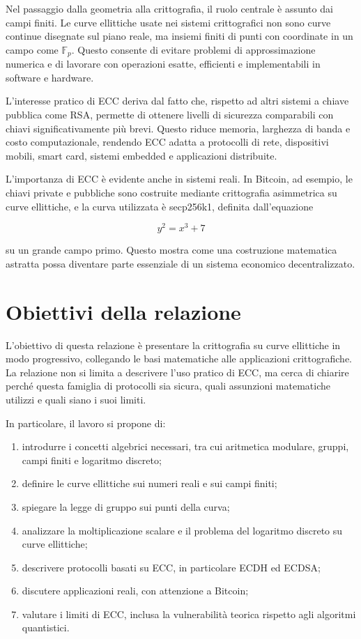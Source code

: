 \documentclass[12pt,a4paper,oneside]{report}
\begin{document}
Nel passaggio dalla geometria alla crittografia, il ruolo centrale è assunto dai campi finiti. Le curve ellittiche usate nei sistemi crittografici non sono curve continue disegnate sul piano reale, ma insiemi finiti di punti con coordinate in un campo come \(\mathbb{F}_p\). Questo consente di evitare problemi di approssimazione numerica e di lavorare con operazioni esatte, efficienti e implementabili in software e hardware.

L'interesse pratico di ECC deriva dal fatto che, rispetto ad altri sistemi a chiave pubblica come RSA, permette di ottenere livelli di sicurezza comparabili con chiavi significativamente più brevi. Questo riduce memoria, larghezza di banda e costo computazionale, rendendo ECC adatta a protocolli di rete, dispositivi mobili, smart card, sistemi embedded e applicazioni distribuite.

L'importanza di ECC è evidente anche in sistemi reali. In Bitcoin, ad esempio, le chiavi private e pubbliche sono costruite mediante crittografia asimmetrica su curve ellittiche, e la curva utilizzata è secp256k1, definita dall'equazione

\begin{equation}
    y^2 = x^3 + 7
\end{equation}

su un grande campo primo. Questo mostra come una costruzione matematica astratta possa diventare parte essenziale di un sistema economico decentralizzato.

\section{Obiettivi della relazione}

L'obiettivo di questa relazione è presentare la crittografia su curve ellittiche in modo progressivo, collegando le basi matematiche alle applicazioni crittografiche. La relazione non si limita a descrivere l'uso pratico di ECC, ma cerca di chiarire perché questa famiglia di protocolli sia sicura, quali assunzioni matematiche utilizzi e quali siano i suoi limiti.

In particolare, il lavoro si propone di:

\begin{enumerate}
    \item introdurre i concetti algebrici necessari, tra cui aritmetica modulare, gruppi, campi finiti e logaritmo discreto;
    \item definire le curve ellittiche sui numeri reali e sui campi finiti;
    \item spiegare la legge di gruppo sui punti della curva;
    \item analizzare la moltiplicazione scalare e il problema del logaritmo discreto su curve ellittiche;
    \item descrivere protocolli basati su ECC, in particolare ECDH ed ECDSA;
    \item discutere applicazioni reali, con attenzione a Bitcoin;
    \item valutare i limiti di ECC, inclusa la vulnerabilità teorica rispetto agli algoritmi quantistici.
\end{enumerate}
\end{document}
